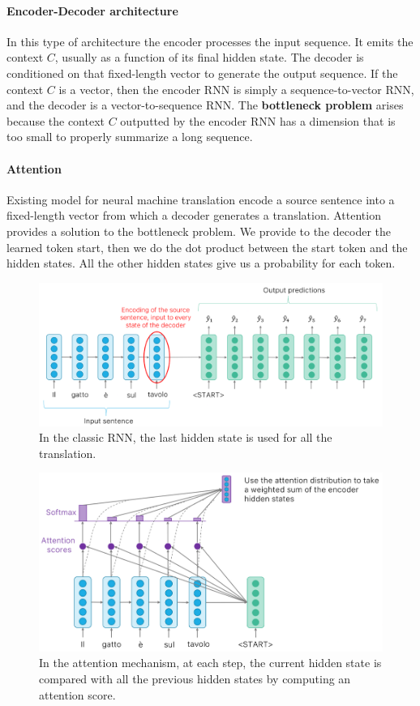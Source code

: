 \paragraph{Encoder-Decoder architecture}
In this type of architecture the encoder processes the input sequence.
It emits the context $C$, usually as a function of its final hidden state.
The decoder is conditioned on that fixed-length vector to generate the output sequence.
If the context $C$ is a vector, then the encoder RNN is simply a sequence-to-vector RNN, and the decoder is a vector-to-sequence RNN.
The \textbf{bottleneck problem} arises because the context $C$ outputted by the encoder RNN has a dimension that is too small to properly summarize a long sequence.

\paragraph{Attention}
Existing model for neural machine translation encode a source sentence into a fixed-length vector from which a decoder generates a translation.
Attention provides a solution to the bottleneck problem. 
We provide to the decoder the learned token start, then we do the dot product between the start token and the hidden states.
All the other hidden states give us a probability for each token.

\begin{figure}[htbp]
  \centering
  \includegraphics[width=0.8\linewidth]{./img/rnn_classic.png}
  \caption{In the classic RNN, the last hidden state is used for all the translation.}
\end{figure}

\begin{figure}[htbp]
  \centering
  \includegraphics[width=0.8\linewidth]{./img/attention.png}
  \caption{In the attention mechanism, at each step, the current hidden state is compared with all the previous hidden states by computing an attention score.}
\end{figure}

